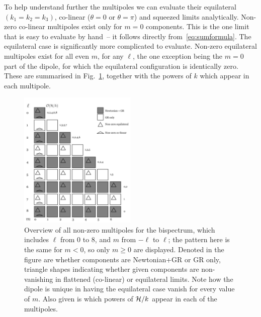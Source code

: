 To help understand further the multipoles we can evaluate their equilateral $(k_1=k_2=k_3)$, co-linear ($\theta=0$ or $\theta=\pi$) and squeezed limits analytically.  
Non-zero co-linear multipoles exist only for $m=0$ components. This is the one limit that is easy to evaluate by hand~-- it follows directly from~\eqref{eq:sumformula}. 
The equilateral case is significantly more complicated to evaluate.
Non-zero equilateral multipoles exist for all even $m$, for any $\ell$, the one exception being the $m=0$ part of the dipole, for which the equilateral configuration is identically zero. These are summarised in Fig.~\ref{fig:blm_overview}, together with the powers of $k$ which appear in each multipole.
\begin{figure}[ht]
\centering
\includegraphics[width=0.5\textwidth]{fig/overview.pdf}
\caption{Overview of all non-zero multipoles for the bispectrum, which includes $\ell$ from 0 to 8, and $m$ from $-\ell$ to $\ell$; the pattern here is the same for $m < 0$, so only $m \geq 0$ are displayed. Denoted in the figure are whether components are Newtonian+GR or GR only, triangle shapes indicating whether given components are non-vanishing in flattened (co-linear) or equilateral limits. Note how the dipole is unique in having the equilateral case vanish for every value of \(m\). Also given is which powers of $\mathcal{H}/k$ appear in each of the multipoles. \label{fig:blm_overview}}
\end{figure}

